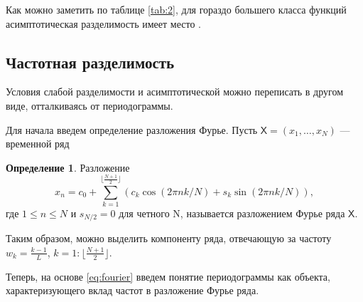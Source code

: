 \documentclass[12pt, specialist, subf
]{disser}
\theoremstyle{definition}
\newcommand{\TS}{\mathsf{X}}
\newtheorem{definition}{Определение} %
\begin{document}
Как можно заметить по таблице \ref{tab:2}, для гораздо большего класса функций асимптотическая разделимость имеет место \cite{golyandina2001analysis}.
\begin{table}[H]
	\begin{center}
		\caption{Асимптотическая разделимость}
		\label{tab:2}
	\end{center}
\end{table}


\subsection{Частотная разделимость}
\label{subsec:freq_razd}

Условия слабой разделимости и асимптотической можно переписать в другом виде, отталкиваясь от периодограммы.

Для начала введем определение разложения Фурье.
Пусть $\TS = (x_1, \dots, x_N)$ — временной ряд
\begin{definition}
	Разложение
	\begin{equation}
		\label{eq:fourier}
		x_n = c_0 + \sum\limits_{k = 1}^{\lfloor \frac{N+1}{2} \rfloor}\left(c_k \cos(2\pi n k / N) + s_k \sin(2\pi n k / N) \right),
	\end{equation}
	где $1 \leq n \leq N$ и $s_{N/2} = 0 $ для четного N, называется разложением Фурье ряда $\TS$.
\end{definition}

Таким образом, можно выделить компоненту ряда, отвечающую за частоту $w_k = \frac{k-1}{L}$, $k = 1:\lfloor \frac{N+1}{2} \rfloor$.


Теперь, на основе \eqref{eq:fourier} введем понятие периодограммы \cite{golyandina2001analysis} как объекта, характеризующего вклад частот в разложение Фурье ряда.
\end{document}
